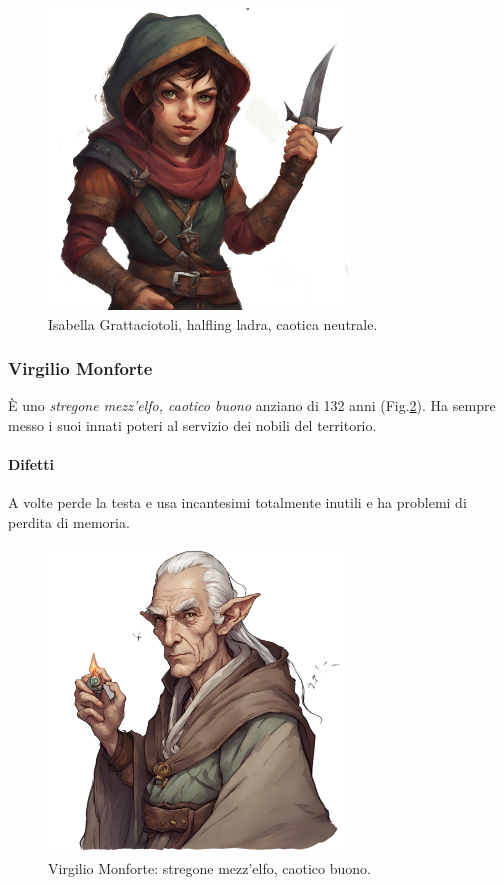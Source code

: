 \documentclass[letterpaper,twocolumn,openany,nodeprecatedcode]{dndbook}
\begin{document}
\begin{figure}
\centering
\includegraphics[width=8cm]{img/isabella-grattaciotoli.png}
    \caption{\textsf{Isabella Grattaciotoli, halfling ladra, caotica neutrale.}\cite{url:ai}}
    \label{fig:isabella}
\end{figure}




\subsubsection{Virgilio Monforte}
È uno \textit{stregone mezz'elfo, caotico buono} anziano di 132 anni (Fig.\ref{fig:virgilio}). Ha sempre messo i suoi innati poteri al servizio dei nobili del territorio.
\paragraph{Difetti} A volte perde la testa e usa incantesimi totalmente inutili e ha problemi di perdita di memoria.

\begin{figure}
\centering
\includegraphics[width=8cm]{img/virgilio-monforte.png}
    \caption{\textsf{Virgilio Monforte: stregone mezz'elfo, caotico buono.}\cite{url:ai}}
    \label{fig:virgilio}
\end{figure}
\end{document}
